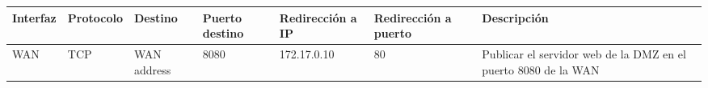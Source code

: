 \documentclass{article}
\renewcommand{\_}{\oldunderscore\hskip0pt\relax}
\begin{document}
{\footnotesize\setlength{\tabcolsep}{2pt}\begin{longtable}[]{@{}lllllll@{}}
\toprule
\begin{minipage}[b]{0.070\columnwidth}\raggedright
Interfaz\strut
\end{minipage} & \begin{minipage}[b]{0.085\columnwidth}\raggedright
Protocolo\strut
\end{minipage} & \begin{minipage}[b]{0.088\columnwidth}\raggedright
Destino\strut
\end{minipage} & \begin{minipage}[b]{0.075\columnwidth}\raggedright
Puerto destino\strut
\end{minipage} & \begin{minipage}[b]{0.105\columnwidth}\raggedright
Redirección a IP\strut
\end{minipage} & \begin{minipage}[b]{0.115\columnwidth}\raggedright
Redirección a puerto\strut
\end{minipage} & \begin{minipage}[b]{0.303\columnwidth}\raggedright
Descripción\strut
\end{minipage}\tabularnewline
\midrule
\endhead
\begin{minipage}[t]{0.070\columnwidth}\raggedright
WAN\strut
\end{minipage} & \begin{minipage}[t]{0.085\columnwidth}\raggedright
TCP\strut
\end{minipage} & \begin{minipage}[t]{0.088\columnwidth}\raggedright
WAN address\strut
\end{minipage} & \begin{minipage}[t]{0.075\columnwidth}\raggedright
8080\strut
\end{minipage} & \begin{minipage}[t]{0.105\columnwidth}\raggedright
172.17.0.10\strut
\end{minipage} & \begin{minipage}[t]{0.115\columnwidth}\raggedright
80\strut
\end{minipage} & \begin{minipage}[t]{0.303\columnwidth}\raggedright
Publicar el servidor web de la DMZ en el puerto 8080 de la WAN\strut
\end{minipage}\tabularnewline
\bottomrule
\end{longtable}}
\end{document}
